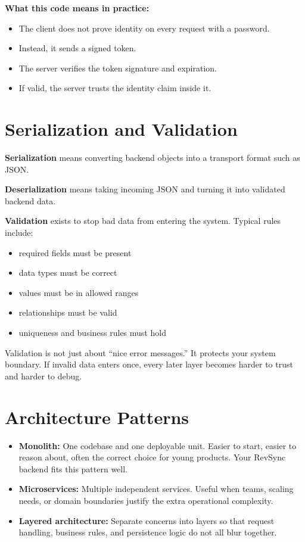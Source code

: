 \documentclass[12pt, a4paper, oneside]{book}
\begin{document}
\textbf{What this code means in practice:}
\begin{itemize}[leftmargin=2em]
    \item The client does not prove identity on every request with a password.
    \item Instead, it sends a signed token.
    \item The server verifies the token signature and expiration.
    \item If valid, the server trusts the identity claim inside it.
\end{itemize}

\section{Serialization and Validation}

\textbf{Serialization} means converting backend objects into a transport format such as JSON.

\textbf{Deserialization} means taking incoming JSON and turning it into validated backend data.

\textbf{Validation} exists to stop bad data from entering the system. Typical rules include:
\begin{itemize}[leftmargin=2em]
    \item required fields must be present
    \item data types must be correct
    \item values must be in allowed ranges
    \item relationships must be valid
    \item uniqueness and business rules must hold
\end{itemize}

\begin{intuitionbox}
Validation is not just about ``nice error messages.'' It protects your system boundary. If invalid data enters once, every later layer becomes harder to trust and harder to debug.
\end{intuitionbox}

\section{Architecture Patterns}

\begin{itemize}[leftmargin=2em]
    \item \textbf{Monolith:} One codebase and one deployable unit. Easier to start, easier to reason about, often the correct choice for young products. Your RevSync backend fits this pattern well.
    \item \textbf{Microservices:} Multiple independent services. Useful when teams, scaling needs, or domain boundaries justify the extra operational complexity.
    \item \textbf{Layered architecture:} Separate concerns into layers so that request handling, business rules, and persistence logic do not all blur together.
\end{itemize}
\end{document}
